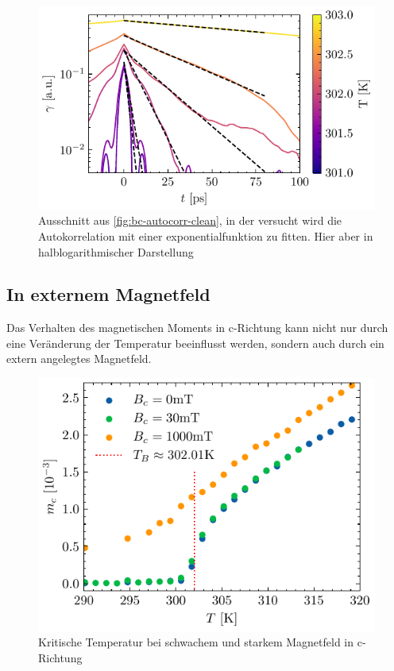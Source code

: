 \documentclass[main.tex]{subfiles}
\begin{document}
\begin{figure}[H]
    \centering
    \includegraphics{bilder/plots/temp_comparison/autocorrelation_cleaned_log.pdf}
    \caption{Ausschnitt aus \cref{fig:bc-autocorr-clean}, in der versucht wird die Autokorrelation mit einer exponentialfunktion zu fitten. Hier aber in halblogarithmischer Darstellung}\label{fig:temp-autocorr-fit}
\end{figure}

\subsection{In externem Magnetfeld}

Das Verhalten des magnetischen Moments in c-Richtung kann nicht nur durch eine Veränderung der Temperatur beeinflusst werden, sondern auch durch ein extern angelegtes Magnetfeld.

\begin{figure}[H]
    \centering
    \includegraphics{bilder/plots/Bz_comparison/critical_temperature.pdf}
    \caption{Kritische Temperatur bei schwachem und starkem Magnetfeld in c-Richtung }\label{fig:bc-crit-temp}
\end{figure}
\end{document}
